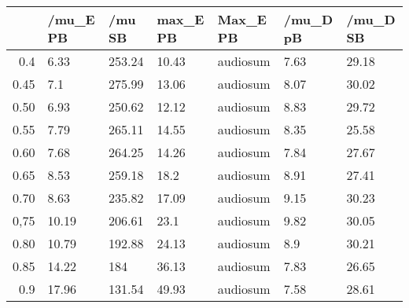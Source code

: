 \begin{table}[ht]
\centering
\begin{tabular}{rllllll}
  \hline
 & /mu\_E PB & /mu SB & max\_E PB & Max\_E PB & /mu\_D pB & /mu\_D SB \\ 
  \hline
0.4 & 6.33 & 253.24 & 10.43 & audiosum & 7.63 & 29.18 \\ 
  0.45 & 7.1 & 275.99 & 13.06 & audiosum & 8.07 & 30.02 \\ 
  0.50 & 6.93 & 250.62 & 12.12 & audiosum & 8.83 & 29.72 \\ 
  0.55 & 7.79 & 265.11 & 14.55 & audiosum & 8.35 & 25.58 \\ 
  0.60 & 7.68 & 264.25 & 14.26 & audiosum & 7.84 & 27.67 \\ 
  0.65 & 8.53 & 259.18 & 18.2 & audiosum & 8.91 & 27.41 \\ 
  0.70 & 8.63 & 235.82 & 17.09 & audiosum & 9.15 & 30.23 \\ 
  0,75 & 10.19 & 206.61 & 23.1 & audiosum & 9.82 & 30.05 \\ 
  0.80 & 10.79 & 192.88 & 24.13 & audiosum & 8.9 & 30.21 \\ 
  0.85 & 14.22 & 184 & 36.13 & audiosum & 7.83 & 26.65 \\ 
  0.9 & 17.96 & 131.54 & 49.93 & audiosum & 7.58 & 28.61 \\ 
   \hline
\end{tabular}
\end{table}
